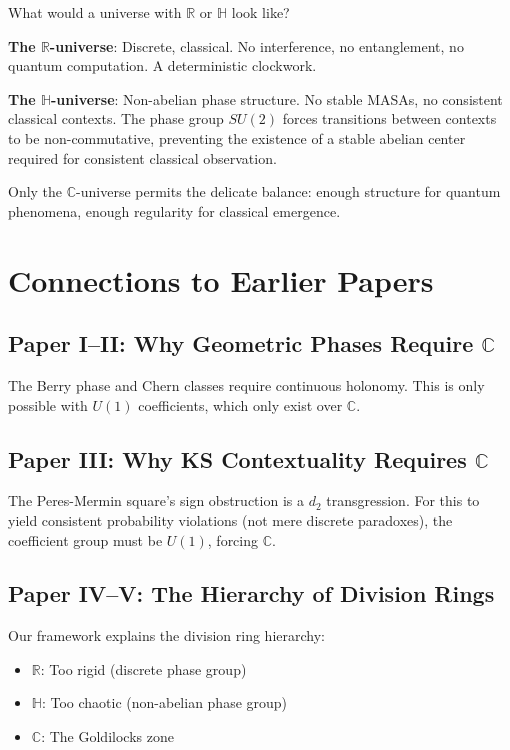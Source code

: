\documentclass[11pt]{article}
\begin{document}
What would a universe with $\mathbb{R}$ or $\mathbb{H}$ look like?

\textbf{The $\mathbb{R}$-universe}: Discrete, classical. No interference, no entanglement, no quantum computation. A deterministic clockwork.

\textbf{The $\mathbb{H}$-universe}: Non-abelian phase structure. No stable MASAs, no consistent classical contexts. The phase group $SU(2)$ forces transitions between contexts to be non-commutative, preventing the existence of a stable abelian center required for consistent classical observation.

Only the $\mathbb{C}$-universe permits the delicate balance: enough structure for quantum phenomena, enough regularity for classical emergence.

\section{Connections to Earlier Papers}
\label{connections-to-earlier-papers}

\subsection{Paper I--II: Why Geometric Phases Require $\mathbb{C}$}
\label{paper-i-ii}

The Berry phase and Chern classes require continuous holonomy. This is only possible with $U(1)$ coefficients, which only exist over $\mathbb{C}$.

\subsection{Paper III: Why KS Contextuality Requires $\mathbb{C}$}
\label{paper-iii}

The Peres-Mermin square's sign obstruction is a $d_2$ transgression. For this to yield consistent probability violations (not mere discrete paradoxes), the coefficient group must be $U(1)$, forcing $\mathbb{C}$.

\subsection{Paper IV--V: The Hierarchy of Division Rings}
\label{paper-iv-v}

Our framework explains the division ring hierarchy:
\begin{itemize}
\item $\mathbb{R}$: Too rigid (discrete phase group)
\item $\mathbb{H}$: Too chaotic (non-abelian phase group)
\item $\mathbb{C}$: The Goldilocks zone
\end{itemize}
\end{document}
